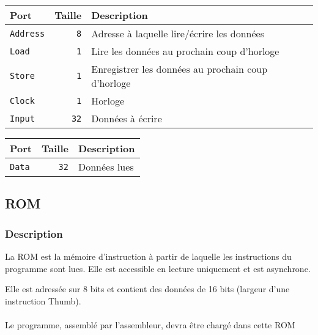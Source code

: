 \documentclass{article}
\begin{document}
    \begin{tabular}{|l|r|l|}
        \hline
        \textbf{Port}   & \textbf{Taille} & \textbf{Description}                               \\
        \hline

        \texttt{Address} & \texttt{8}      & Adresse à laquelle lire/écrire les données         \\
        \hline
        \texttt{Load}   & \texttt{1}      & Lire les données au prochain coup d'horloge        \\
        \hline
        \texttt{Store}  & \texttt{1}      & Enregistrer les données au prochain coup d'horloge \\
        \hline
        \texttt{Clock}  & \texttt{1}      & Horloge                                            \\
        \hline
        \texttt{Input}  & \texttt{32}     & Données à écrire                                   \\


        \hline
    \end{tabular}


    \begin{tabular}{|l|r|l|}
        \hline
        \textbf{Port}   & \textbf{Taille} & \textbf{Description} \\
        \hline
        \texttt{Data} & \texttt{32}     & Données lues         \\

        \hline
    \end{tabular}

    \subsection{ROM}

    \subsubsection{Description}

    La ROM est la mémoire d'instruction à partir de laquelle les instructions du programme sont lues.
    Elle est accessible en lecture uniquement et est asynchrone.

    Elle est adressée sur 8 bits et contient des données de 16 bits (largeur d'une instruction Thumb).

    \paragraph{}
    Le programme, assemblé par l'assembleur, devra être chargé dans cette ROM
\end{document}
